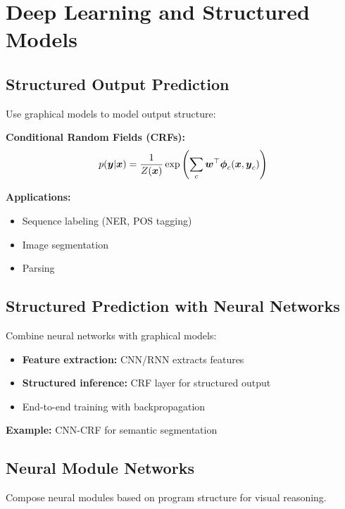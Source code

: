 
\section{Deep Learning and Structured Models }
\label{sec:deep-structured}

\subsection{Structured Output Prediction}

Use graphical models to model output structure:

\textbf{Conditional Random Fields (CRFs):}
\begin{equation}
p(\boldsymbol{y}|\boldsymbol{x}) = \frac{1}{Z(\boldsymbol{x})} \exp\left(\sum_c \boldsymbol{w}^\top \boldsymbol{\phi}_c(\boldsymbol{x}, \boldsymbol{y}_c)\right)
\end{equation}

\textbf{Applications:}
\begin{itemize}
    \item Sequence labeling (NER, POS tagging)
    \item Image segmentation
    \item Parsing
\end{itemize}

\subsection{Structured Prediction with Neural Networks}

Combine neural networks with graphical models:
\begin{itemize}
    \item \textbf{Feature extraction:} CNN/RNN extracts features
    \item \textbf{Structured inference:} CRF layer for structured output
    \item End-to-end training with backpropagation
\end{itemize}

\textbf{Example:} CNN-CRF for semantic segmentation

\subsection{Neural Module Networks}

Compose neural modules based on program structure for visual reasoning.

